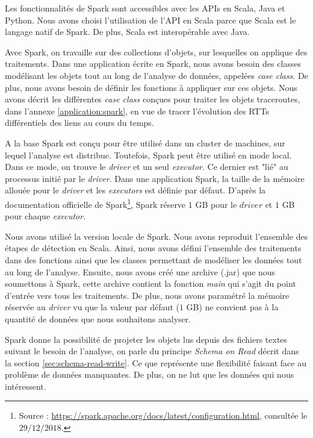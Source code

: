 Les fonctionnalités de Spark sont accessibles avec les  APIs en Scala, Java et Python. Nous avons choisi l'utilisation de l'API en Scala parce que Scala est le langage natif de Spark. De plus, Scala est interopérable avec Java.  

Avec Spark, on travaille sur des collections d'objets, sur lesquelles on applique des traitements. Dans une application écrite en Spark, nous avons besoin des classes modélisant les objets tout au long de l'analyse de données, appelées \textit{case class}. De plus, nous avons besoin de définir les fonctions à appliquer  sur ces objets. Nous avons décrit les différentes \textit{case class} conçues pour traiter les objets traceroutes, dans l'annexe \ref{application:spark}, en vue de tracer l'évolution des RTTs différentiels des liens au cours du temps. 

A la base Spark est conçu pour être utilisé dans un cluster de machines, sur  lequel l'analyse est distribue. Toutefois, Spark peut être utilisé en mode local. Dans ce mode, on trouve le \textit{driver} et un seul \textit{executor}. Ce dernier est "lié" au processus initié par le \textit{driver}. 
Dans une application Spark, la taille de la mémoire allouée pour le \textit{driver} et les \textit{executors} est  définie par défaut. D'après la documentation officielle de Spark\footnote{Source : \url{https://spark.apache.org/docs/latest/configuration.html}, consultée le $29/12/2018$.}, Spark réserve $ 1 $ GB pour le $ driver $ et $ 1 $ GB pour chaque \textit{executor}. 


Nous avons utilisé la version locale de Spark. Nous avons reproduit l'ensemble des étapes de détection en Scala. Ainsi,  nous avons défini l'ensemble des traitements dans des fonctions ainsi que les classes permettant de modéliser les données tout au long de l'analyse. Ensuite, nous avons créé une archive (.jar) que nous soumettons à Spark, cette archive contient la fonction \textit{main} qui s'agit du point d'entrée vers tous les traitements. De plus, nous avons paramétré la mémoire  réservée au \textit{driver} vu que la valeur par défaut ($1$ GB) ne convient pas à la quantité de données que nous souhaitons analyser.


Spark donne la possibilité  de projeter les objets lus  depuis des  fichiers textes suivant le besoin de l'analyse, on parle du principe \textit{ Schema on Read} décrit dans la section \ref{sec:schema-read-write}. Ce que représente une flexibilité faisant face au problème de données manquantes.  De plus, on ne lut que les données qui nous intéressent. 
 

